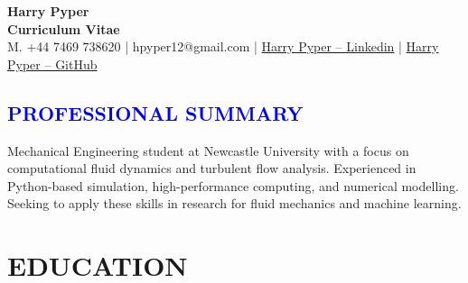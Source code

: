 \documentclass[../main.tex]{subfiles}
\begin{document}
\justifying
\pagestyle{empty}
\begin{center}
    
    \textbf{\Huge Harry Pyper }\\[3pt] %
    \textbf{Curriculum Vitae}\\[1pt] %
    M. +44 7469 738620 | {hpyper12@gmail.com} | \href{http://www.linkedin.com/in/harry--pyper12}{{Harry Pyper -- Linkedin}} | \href{https://github.com/harrypyper}{{Harry Pyper -- GitHub}}
\end{center}

\textcolor{blue}{
\section*{PROFESSIONAL SUMMARY}
}
    \noindent
    \newline
    Mechanical Engineering student at Newcastle University with a focus on computational fluid dynamics and turbulent flow analysis. Experienced in Python-based simulation, high-performance computing, and numerical modelling. Seeking to apply these skills in research for fluid mechanics and machine learning.

\section*{EDUCATION}

    \noindent
\end{document}
